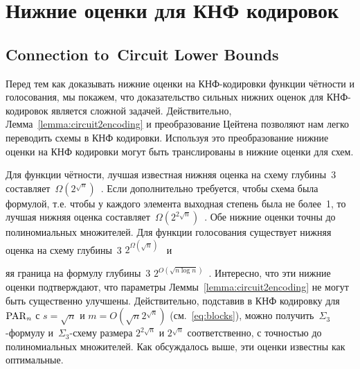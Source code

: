 \section{Нижние оценки для КНФ кодировок}
\label{section:lowerbounds}

\subsection{Connection to~Circuit Lower Bounds}

Перед тем как доказывать нижние оценки на КНФ-кодировки функции чётности и голосования, мы покажем, что доказательство сильных нижних оценок для КНФ-кодировок является сложной задачей. Действительно, Лемма~\ref{lemma:circuit2encoding} и преобразование Цейтена позволяют нам легко переводить схемы в КНФ кодировки. Используя это преобразование нижние оценки на КНФ кодировки могут быть транслированы в нижние оценки для схем.

Для функции чётности,
лучшая известная нижняя оценка на схему глубины~3 составляет~$\Omega(2^{\sqrt{n}})$~\cite{DBLP:journals/cjtcs/PaturiPZ99}.
Если дополнительно требуется, чтобы схема была формулой, т.е. чтобы у каждого элемента выходная степень была не более~1, то лучшая нижняя оценка составляет~$\Omega(2^{2\sqrt{n}})$~\cite{DBLP:journals/eccc/Hirahara17}.
Обе нижние оценки точны до полиномиальных множителей.
Для функции голосования 
существует нижняя оценка на схему глубины~3
$2^{\Omega(\sqrt{n})}$~\cite{Hastad, Hastad1995} и 

яя граница на формулу глубины~3 $2^{O(\sqrt{n\log n})}$~\cite{DBLP:journals/eccc/Hirahara17, 10.1145/800057.808717}.
Интересно, что эти нижние оценки подтверждают, что параметры Леммы~\ref{lemma:circuit2encoding}
не могут быть существенно улучшены. Действительно, подставив в КНФ кодировку для ~$\operatorname{PAR}_n$ с  $s=\sqrt n$ и $m=O(\sqrt n2^{\sqrt n})$
(см.~\eqref{eq:blocks}),
можно получить~$\Sigma_3$-формулу и~$\Sigma_3$-схему размера $2^{2\sqrt n}$
и $2^{\sqrt n}$ соответственно, с точностью до полиномиальных множителей. Как обсуждалось выше,
эти оценки известны как оптимальные.

